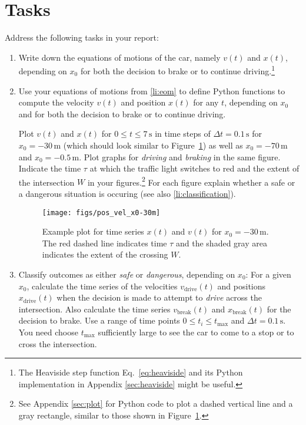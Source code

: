 \documentclass[letterpaper]{scrartcl}
\newenvironment{enuma}{\begin{enumerate}[label=(\alph*)]}{\end{enumerate}}
\begin{document}
\section{Tasks}
\label{sec:tasks}
Address the following tasks in your report:

\begin{enuma}
\item Write down the equations of motions of the car, namely $v(t)$
  and $x(t)$, depending on $x_0$ for both the decision to brake or to
  continue driving.\footnote{The Heaviside step function
    Eq.~\ref{eq:heaviside} and its Python implementation in Appendix
    \ref{sec:heaviside} might be useful.}\label{li:eom}

\item Use your equations of motions from \ref{li:eom} to define Python
  functions to compute the velocity $v(t)$ and position $x(t)$ for any
  $t$, depending on $x_0$ and for both the decision to brake or to
  continue driving.

  Plot $v(t)$ and $x(t)$ for $0 \le t \le 7\,\text{s}$ in time steps
  of $\Delta t = 0.1\,\text{s}$ for $x_{0} = -30\,\text{m}$ (which
  should look similar to Figure~\ref{fig:timeseries}) as well as
  $x_{0} = -70\,\text{m}$ and $x_{0} = -0.5\,\text{m}$. Plot graphs
  for \emph{driving} and \emph{braking} in the same figure. Indicate
  the time $\tau$ at which the traffic light switches to red and the
  extent of the intersection $W$ in your figures.\footnote{See
    Appendix \ref{sec:plot} for Python code to plot a dashed vertical
    line and a gray rectangle, similar to those shown in
    Figure~\protect\ref{fig:timeseries}.} For each figure explain
  whether a safe or a dangerous situation is occuring (see also
  \ref{li:classification}).
   
  \begin{figure}
    \centering
    \texttt{[image: figs/pos\_vel\_x0-30m]}
    \caption{Example plot for time series $x(t)$ and $v(t)$ for
      $x_0 = -30\,\text{m}$. The red dashed line indicates time $\tau$
      and the shaded gray area indicates the extent of the crossing
      $W$.}
    \label{fig:timeseries}
  \end{figure}

\item \label{li:classification} Classify outcomes as either
  \emph{safe} or \emph{dangerous}, depending on $x_{0}$: For a given
  $x_{0}$, calculate the time series of the velocities
  $v_{\text{drive}}(t)$ and positions $x_{\text{drive}}(t)$ when the
  decision is made to attempt to \emph{drive} across the
  intersection. Also calculate the time series $v_{\text{break}}(t)$
  and $x_{\text{break}}(t)$ for the decision to brake. Use a range of
  time points $0 \le t_{i} \le t_{\text{max}}$ and
  $\Delta t = 0.1\,\text{s}$. You need choose $t_{\text{max}}$
  sufficiently large to see the car to come to a stop or to cross the
  intersection.


\end{enuma}
\end{document}
